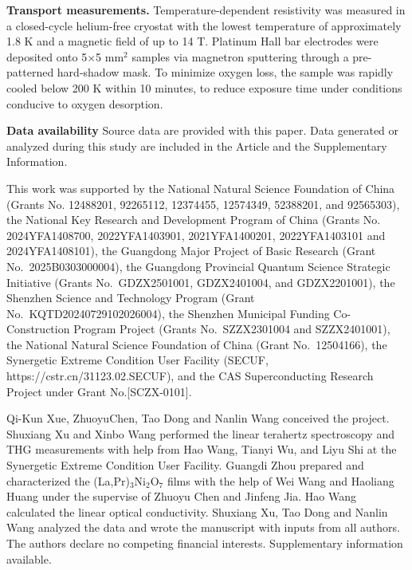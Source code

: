 \documentclass{nature}
\begin{document}
\textbf{Transport measurements.} Temperature-dependent resistivity was measured in a closed-cycle helium-free cryostat with the lowest temperature of approximately 1.8 K and a magnetic field of up to 14 T. Platinum Hall bar electrodes were deposited onto 5$\times$5 mm$ ^{2} $ samples via magnetron sputtering through a pre-patterned hard-shadow mask. To minimize oxygen loss, the sample was rapidly cooled below 200 K within 10 minutes, to reduce exposure time under conditions conducive to oxygen desorption.


\medbreak
\textbf{Data availability} Source data are provided with this paper. Data generated or analyzed during this study are included in the Article and the Supplementary Information. 






\vspace{18pt}

%

%



\medbreak
\vspace{18pt}
 This work was supported by the National Natural Science Foundation of China (Grants No. 12488201, 92265112, 12374455, 12574349, 52388201, and 92565303), the National Key Research and Development Program of China (Grants No. 2024YFA1408700, 2022YFA1403901, 2021YFA1400201, 2022YFA1403101 and 2024YFA1408101), the Guangdong Major Project of Basic Research (Grant No.~2025B0303000004), the Guangdong Provincial Quantum Science Strategic Initiative (Grants No.~GDZX2501001, GDZX2401004, and GDZX2201001), the Shenzhen Science and Technology Program (Grant No.~KQTD20240729102026004), the Shenzhen Municipal Funding Co-Construction Program Project (Grants No.~SZZX2301004 and SZZX2401001), the National Natural Science Foundation of China (Grant No.~12504166), the Synergetic Extreme Condition User Facility (SECUF, https://cstr.cn/31123.02.SECUF), and the CAS Superconducting Research Project under Grant No.[SCZX-0101].

\medbreak
{} Qi-Kun Xue, ZhuoyuChen, Tao Dong and Nanlin Wang conceived the project. Shuxiang Xu and Xinbo Wang performed the linear terahertz spectroscopy and THG measurements with help from Hao Wang, Tianyi Wu, and Liyu Shi at the Synergetic Extreme Condition User Facility. Guangdi Zhou prepared and characterized the (La,Pr)$_3$Ni$_2$O$_{7}$ films with the help of Wei Wang and Haoliang Huang under the supervise of Zhuoyu Chen and Jinfeng Jia. Hao Wang calculated the linear optical conductivity. Shuxiang Xu, Tao Dong and Nanlin Wang analyzed the data and wrote the manuscript with inputs from all authors.
\medbreak
{} The authors declare no competing financial interests. 
\medbreak
{} Supplementary information available. 
\clearpage
\end{document}
